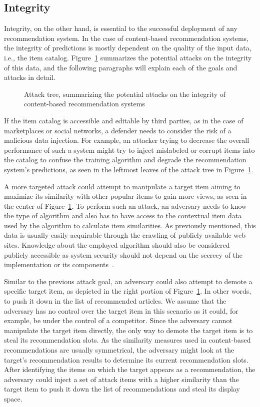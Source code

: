 \subsection{Integrity}
Integrity, on the other hand, is essential to the successful deployment of any recommendation system. In the case of content-based recommendation systems, the integrity of predictions is mostly dependent on the quality of the input data, i.e., the item catalog. Figure~\ref{fig:attack-tree-content} summarizes the potential attacks on the integrity of this data, and the following paragraphs will explain each of the goals and attacks in detail.
\begin{figure}[H]
	\centering
	
	\caption{Attack tree, summarizing the potential attacks on the integrity of content-based recommendation systems}
	\label{fig:attack-tree-content}
\end{figure}
\pagebreak
If the item catalog is accessible and editable by third parties, as in the case of marketplaces or social networks,  a defender needs to consider the risk of a malicious data injection. For example, an attacker trying to decrease the overall performance of such a system might try to inject mislabeled or corrupt items into the catalog to confuse the training algorithm and degrade the recommendation system's predictions, as seen in the leftmost leaves of the attack tree in Figure~\ref{fig:attack-tree-content}.

A more targeted attack could attempt to manipulate a target item aiming to maximize its similarity with other popular items to gain more views, as seen in the center of Figure~\ref{fig:attack-tree-content}. To perform such an attack, an adversary needs to know the type of algorithm and also has to have access to the contextual item data used by the algorithm to calculate item similarities. As previously mentioned, this data is usually easily acquirable through the crawling of publicly available web sites. Knowledge about the employed algorithm should also be considered publicly accessible as system security should not depend on the secrecy of the implementation or its components~\parencite{scarfone2008guide}.

Similar to the previous attack goal, an adversary could also attempt to demote a specific target item, as depicted in the right portion of Figure~\ref{fig:attack-tree-content}. In other words, to push it down in the list of recommended articles. We assume that the adversary has no control over the target item in this scenario as it could, for example, be under the control of a competitor. Since the adversary cannot manipulate the target item directly, the only way to demote the target item is to steal its recommendation slots. As the similarity measures used in content-based recommendations are usually symmetrical, the adversary might look at the target's recommendation results to determine its current recommendation slots. After identifying the items on which the target appears as a recommendation, the adversary could inject a set of attack items with a higher similarity than the target item to push it down the list of recommendations and steal its display space.
